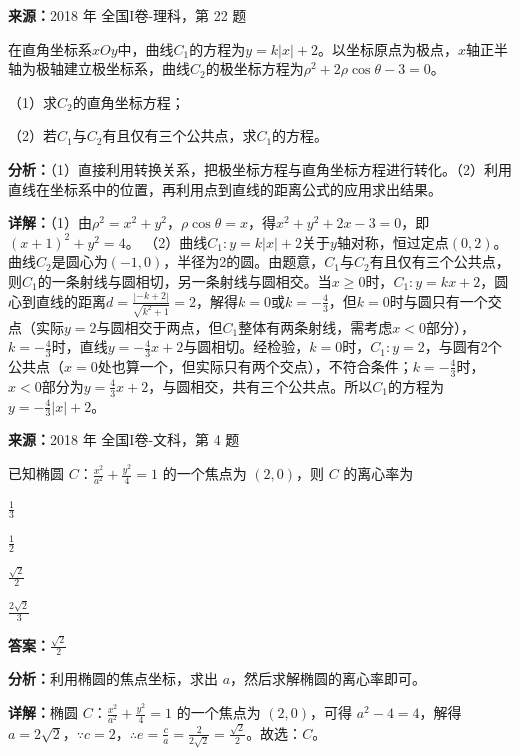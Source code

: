 \begin{question}[points=10]
\textbf{来源：}2018 年 全国I卷-理科，第 22 题\par
在直角坐标系$xOy$中，曲线$C_1$的方程为$y=k|x|+2$。以坐标原点为极点，$x$轴正半轴为极轴建立极坐标系，曲线$C_2$的极坐标方程为$\rho^2+2\rho\cos\theta-3=0$。

（1）求$C_2$的直角坐标方程；

（2）若$C_1$与$C_2$有且仅有三个公共点，求$C_1$的方程。
\begin{solution}

\textbf{分析：}（1）直接利用转换关系，把极坐标方程与直角坐标方程进行转化。（2）利用直线在坐标系中的位置，再利用点到直线的距离公式的应用求出结果。

\textbf{详解：}（1）由$\rho^2=x^2+y^2$，$\rho\cos\theta=x$，得$x^2+y^2+2x-3=0$，即$(x+1)^2+y^2=4$。
（2）曲线$C_1:y=k|x|+2$关于$y$轴对称，恒过定点$(0,2)$。曲线$C_2$是圆心为$(-1,0)$，半径为2的圆。由题意，$C_1$与$C_2$有且仅有三个公共点，则$C_1$的一条射线与圆相切，另一条射线与圆相交。当$x\geq0$时，$C_1:y=kx+2$，圆心到直线的距离$d=\frac{|-k+2|}{\sqrt{k^2+1}}=2$，解得$k=0$或$k=-\frac{4}{3}$，但$k=0$时与圆只有一个交点（实际$y=2$与圆相交于两点，但$C_1$整体有两条射线，需考虑$x<0$部分），$k=-\frac{4}{3}$时，直线$y=-\frac{4}{3}x+2$与圆相切。经检验，$k=0$时，$C_1:y=2$，与圆有2个公共点（$x=0$处也算一个，但实际只有两个交点），不符合条件；$k=-\frac{4}{3}$时，$x<0$部分为$y=\frac{4}{3}x+2$，与圆相交，共有三个公共点。所以$C_1$的方程为$y=-\frac{4}{3}|x|+2$。
\end{solution}
\end{question}

\begin{question}[points=5]
\textbf{来源：}2018 年 全国I卷-文科，第 4 题\par
已知椭圆 $C$：$\frac{x^2}{a^2}+\frac{y^2}{4}=1$ 的一个焦点为 $(2,0)$，则 $C$ 的离心率为
\begin{choices}
  \item $\frac{1}{3}$
  \item $\frac{1}{2}$
  \item $\frac{\sqrt{2}}{2}$
  \item $\frac{2\sqrt{2}}{3}$
\end{choices}
\begin{solution}
\textbf{答案：}$\frac{\sqrt{2}}{2}$

\textbf{分析：}利用椭圆的焦点坐标，求出 $a$，然后求解椭圆的离心率即可。

\textbf{详解：}椭圆 $C$：$\frac{x^2}{a^2}+\frac{y^2}{4}=1$ 的一个焦点为 $(2,0)$，可得 $a^2-4=4$，解得 $a=2\sqrt{2}$，$\because c=2$，$\therefore e=\frac{c}{a}=\frac{2}{2\sqrt{2}}=\frac{\sqrt{2}}{2}$。故选：$C$。
\end{solution}
\end{question}

